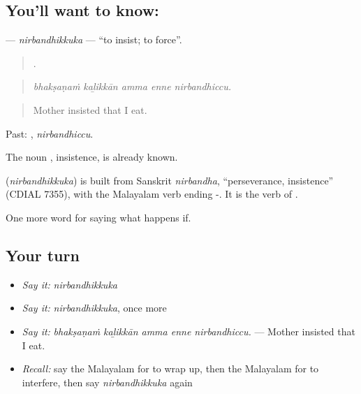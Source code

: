 \subsection*{You'll want to know: }
\textbf{} — \emph{nirbandhikkuka} — \textquotedblleft{}to insist; to force\textquotedblright{}.

\begin{quote}
    .
\end{quote}

\begin{quote}
\emph{bhakṣaṇaṁ kaḻikkān amma enne nirbandhiccu.}
\end{quote}

\begin{quote}
Mother insisted that I eat.
\end{quote}

Past: , \emph{nirbandhiccu}.

The noun , insistence, is already known.

\begin{cousinweb}
\textbf{} (\emph{nirbandhikkuka}) is built from Sanskrit \emph{nirbandha}, \textquotedblleft{}perseverance, insistence\textquotedblright{} (CDIAL 7355), with the Malayalam verb ending -. It is the verb of .
\end{cousinweb}

\begin{grammarlens}[title={What you've built}]
One more word for saying what happens if.
\end{grammarlens}

\subsection*{Your turn}
\begin{itemize}
\raggedright
  \item \emph{Say it:} \emph{nirbandhikkuka}
  \item \emph{Say it:} \emph{nirbandhikkuka}, once more
  \item \emph{Say it:} \emph{bhakṣaṇaṁ kaḻikkān amma enne nirbandhiccu.} — Mother insisted that I eat.
  \item \emph{Recall:} say the Malayalam for to wrap up, then the Malayalam for to interfere, then say \emph{nirbandhikkuka} again
\end{itemize}

